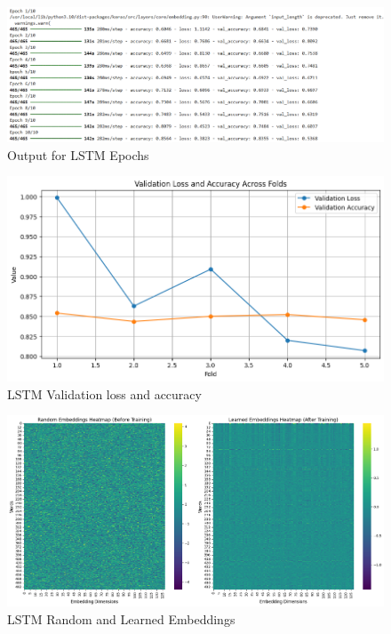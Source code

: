 \begin{figure}[h!]  
    \centering
    \includegraphics[width=1.0\textwidth]{Images/LSTM Epoch.png}  
    \caption{Output for LSTM Epochs}
    \label{LSTm Epochs}  %
\end{figure}

\pagebreak

\begin{figure}[h!]  
    \centering
    \includegraphics[width=1.0\textwidth]{Images/LSTM LA.png}  
    \caption{LSTM Validation loss and accuracy}
    \label{Accuracy Loss}  %
\end{figure}

\begin{figure}[h!]  
    \centering
    \includegraphics[width=1.0\textwidth]{Images/LSTM EMBED.png}  
    \caption{LSTM Random and Learned Embeddings}
    \label{lstm embed}  %
\end{figure}

